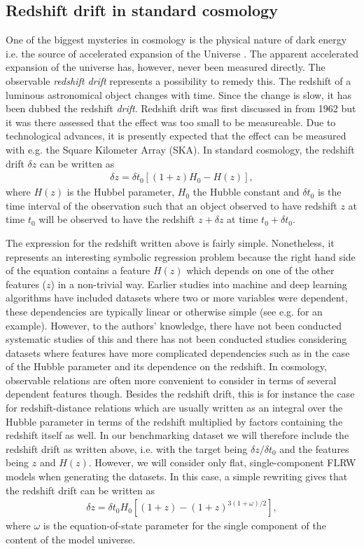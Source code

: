\documentclass[a4paper,11pt]{article}
\begin{document}
\subsection{Redshift drift in standard cosmology}
One of the biggest mysteries in cosmology is the physical nature of dark energy i.e. the source of accelerated expansion of the Universe \cite{DEreview}. The apparent accelerated expansion of the universe has, however, never been measured directly. The observable \emph{redshift drift} represents a possibility to remedy this. The redshift of a luminous astronomical object changes with time. Since the change is slow, it has been dubbed the redshift \emph{drift}. Redshift drift was first discussed in \cite{Sandage, Mcvittie} from 1962 but it was there assessed that the effect was too small to be measureable. Due to technological advances, it is presently expected that the effect can be measured with e.g. the Square Kilometer Array (SKA)\cite{SKA}. In standard cosmology, the redshift drift $\delta z$ can be written as
	\begin{align}
	    \delta z = \delta t_0[(1+z)H_0 - H(z) ],
	\end{align}
	where $H(z)$ is the Hubbel parameter, $H_0$ the Hubble constant and $\delta t_0$ is the time interval of the observation such that an object observed to have redshift $z$ at time $t_0$ will be observed to have the redshift $z+\delta z$ at time $t_0 + \delta t_0$.
	
	The expression for the redshift written above is fairly simple. Nonetheless, it represents an interesting symbolic regression problem because the right hand side of the equation contains a feature $H(z)$ which depends on one of the other features ($z$) in a non-trivial way. Earlier studies into machine and deep learning algorithms have included datasets where two or more variables were dependent, these dependencies are typically linear or otherwise simple (see e.g. \cite{BIMT} for an example). However, to the authors' knowledge, there have not been conducted systematic studies of this and there has not been conducted studies considering datasets where features have more complicated dependencies such as in the case of the Hubble parameter and its dependence on the redshift. In cosmology, observable relations are often more convenient to consider in terms of several dependent features though. Besides the redshift drift, this is for instance the case for redshift-distance relations which are usually written as an integral over the Hubble parameter in terms of the redshift multiplied by factors containing the redshift itself as well. In our benchmarking dataset we will therefore include the redshift drift as written above, i.e. with the target being $\delta z/\delta t_0$ and the features being $z$ and $H(z)$. However, we will consider only flat, single-component FLRW models when generating the datasets. In this case, a simple rewriting gives that the redshift drift can be written as
	\begin{align}
	    \delta z = \delta t_0 H_0[(1+z) - (1+z)^{3(1+\omega)/2}],
	\end{align}
	where $\omega$ is the equation-of-state parameter for the single component of the content of the model universe.
\end{document}
